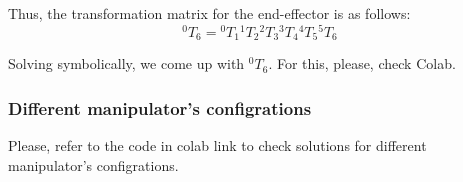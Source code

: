 \documentclass{article}
\begin{document}
Thus, the transformation matrix for the end-effector is as follows:
\[{}^0T_6 = {}^0T_1 {}^1T_2 {}^2T_3 {}^3T_4 {}^4T_5 {}^5T_6\]



Solving symbolically, we come up with ${}^0T_6$. For this, please, check Colab.\\





\newpage

\subsubsection{Different manipulator's configrations}

Please, refer to the code in colab link to check solutions for different manipulator's configrations.
\end{document}
